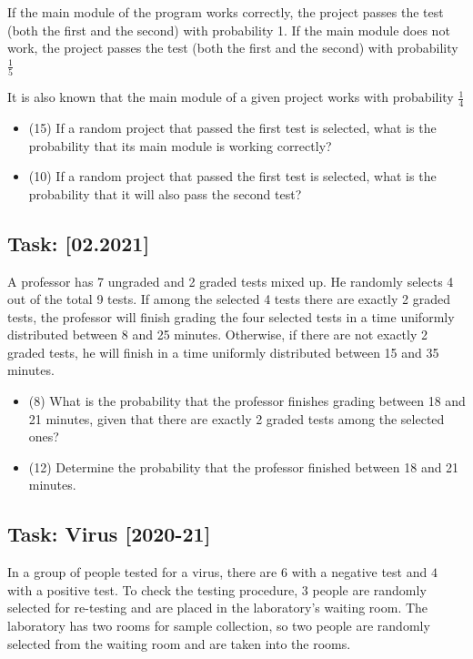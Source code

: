 \documentclass[a4paper, 12pt]{article}
\begin{document}
If the main module of the program works correctly, the project passes the test (both the first and the second) with probability 1. If the main module does not work, the project passes the test (both the first and the second) with probability $\frac{1}{5}$

It is also known that the main module of a given project works with probability $\frac{1}{4}$

\begin{itemize}
    \item [a)] (15) If a random project that passed the first test is selected, what is the probability that its main module is working correctly?
    \item [b)] (10) If a random project that passed the first test is selected, what is the probability that it will also pass the second test?
\end{itemize}



\subsection{Task: [02.2021]}
A professor has 7 ungraded and 2 graded tests mixed up. He randomly selects 4 out of the total 9 tests.
If among the selected 4 tests there are exactly 2 graded tests, the professor will finish grading the four
selected tests in a time uniformly distributed between 8 and 25 minutes. Otherwise, if there are not
exactly 2 graded tests, he will finish in a time uniformly distributed between 15 and 35 minutes.
\begin{itemize}
    
\item [a)] (8) What is the probability that the professor finishes grading between 18 and 21 minutes, given
that there are exactly 2 graded tests among the selected ones?
\item [b)] (12) Determine the probability that the professor finished between 18 and 21 minutes.

\end{itemize}



\subsection*{Task: Virus [2020-21]}

In a group of people tested for a virus, there are $6$ with a negative test and $4$ with a positive test. To check the testing procedure, $3$ people are randomly selected for re-testing and are placed in the laboratory's waiting room. The laboratory has two rooms for sample collection, so two people are randomly selected from the waiting room and are taken into the rooms.
\end{document}
